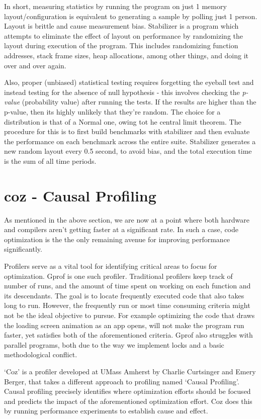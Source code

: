 \documentclass[twoside]{article}
\begin{document}
In short, measuring statistics by running the program on just 1 memory layout/configuration is equivalent to generating a sample by polling just 1 person. Layout is brittle and cause measurement bias. Stabilizer is a program which attempts to eliminate the effect of layout on performance by randomizing the layout during execution of the program. This includes randomizing function addresses, stack frame sizes, heap allocations, among other things, and doing it over and over again. 

Also, proper (unbiased) statistical testing requires forgetting the eyeball test and instead testing for the absence of null hypothesis - this involves checking the \textit{p-value} (probability value) after running the tests. If the results are higher than the p-value, then its highly unlikely that they're random. The choice for a distribution is that of a Normal one, owing tot he central limit theorem. The procedure for this is to first build benchmarks with stabilizer and then evaluate the performance on each benchmark across the entire suite.  Stabilizer generates a new random layout every 0.5 second, to avoid bias, and the total execution time is the sum of all time periods.

\section{coz - Causal Profiling}

As mentioned in the above section, we are now at a point where both hardware and compilers aren’t getting faster at a significant rate. In such a case, code optimization is the the only remaining avenue for improving performance significantly.

Profilers serve as a vital tool for identifying critical areas to focus for optimization. Gprof is one such profiler. Traditional profilers keep track of number of runs, and the amount of time spent on working on each function and its descendants. The goal is to locate frequently executed code that also takes long to run. However, the frequently run or most time consuming criteria might not be the ideal objective to pursue. For example optimizing the code that draws the loading screen animation as an app opens, will not make the program run faster, yet satisfies both of the aforementioned criteria. Gprof also struggles with parallel programs, both due to the way we implement locks and a basic methodological conflict.

‘Coz’ is a profiler developed at UMass Amherst by Charlie Curtsinger and Emery Berger, that takes a different approach to profiling named ‘Causal Profiling’. Causal profiling precisely identifies where optimization efforts should be focused and predicts the impact of the aforementioned optimization effort. Coz does this by running performance experiments to establish cause and effect.
\end{document}
